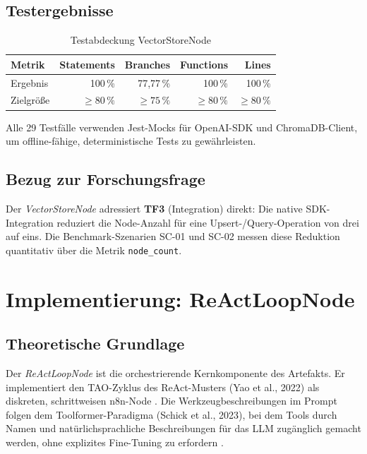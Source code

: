 \documentclass[12pt,a4paper,oneside]{report}
\begin{document}
\section{Testergebnisse}

\begin{table}[H]
  \centering
  \caption{Testabdeckung VectorStoreNode}
  \label{tab:coverage-vector}
  \begin{tabular}{lrrrr}
    \toprule
    \textbf{Metrik} & \textbf{Statements} & \textbf{Branches} & \textbf{Functions} & \textbf{Lines} \\
    \midrule
    Ergebnis & 100\,\% & 77,77\,\% & 100\,\% & 100\,\% \\
    Zielgröße & $\geq 80\,\%$ & $\geq 75\,\%$ & $\geq 80\,\%$ & $\geq 80\,\%$ \\
    \bottomrule
  \end{tabular}
\end{table}

Alle 29 Testfälle verwenden Jest-Mocks für OpenAI-SDK und ChromaDB-Client, um
offline-fähige, deterministische Tests zu gewährleisten.

\section{Bezug zur Forschungsfrage}

Der \textit{VectorStoreNode} adressiert \textbf{TF3} (Integration) direkt: Die
native SDK-Integration reduziert die Node-Anzahl für eine Upsert-/Query-Operation
von drei auf eins. Die Benchmark-Szenarien SC-01 und SC-02 messen diese Reduktion
quantitativ über die Metrik \texttt{node\_count}.

\chapter{Implementierung: ReActLoopNode}

\section{Theoretische Grundlage}

Der \textit{ReActLoopNode} ist die orchestrierende Kernkomponente des Artefakts.
Er implementiert den \ac{TAO}-Zyklus des ReAct-Musters (Yao et al., 2022) als
diskreten, schrittweisen n8n-Node \cite{yao2022react}. Die Werkzeugbeschreibungen
im Prompt folgen dem Toolformer-Paradigma (Schick et al., 2023), bei dem Tools durch
Namen und natürlichsprachliche Beschreibungen für das \ac{LLM} zugänglich gemacht
werden, ohne explizites Fine-Tuning zu erfordern \cite{schick2023toolformer}.
\end{document}
